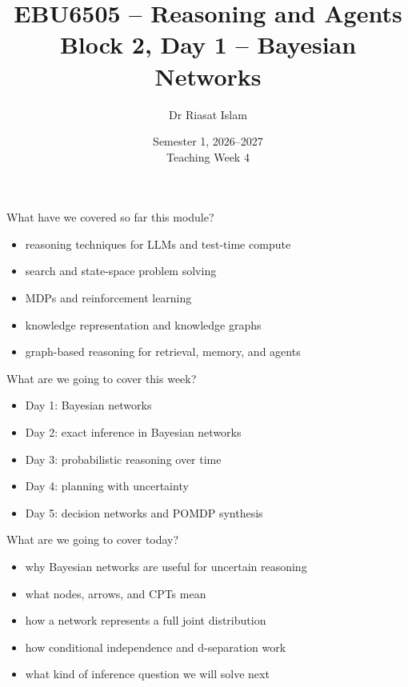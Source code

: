 \documentclass[aspectratio=169]{beamer}
\title[EBU6505 B2 D1]{EBU6505 -- Reasoning and Agents\\Block 2, Day 1 -- Bayesian Networks}
\author{Dr Riasat Islam}
\institute{Queen Mary University of London}
\date[Teaching Week 4]{Semester 1, 2026--2027 \\ Teaching Week 4}
\newcommand{\defaultdeckrefs}{AIMA4e Ch.12--13 pp.385--460; Poole3e Ch.9 pp.375--458}
\newcommand{\currentsliderefs}{\defaultdeckrefs}
\newcommand{\setslideref}[1]{\gdef\currentsliderefs{#1}}
\begin{document}
\setslideref{AIMA4e Ch.12--13 pp.385--460; Poole3e Ch.9 pp.375--458}
\begin{frame}
  \titlepage
\end{frame}

\begin{frame}{What have we covered so far this module?}
\begin{itemize}
  \item reasoning techniques for LLMs and test-time compute
  \item search and state-space problem solving
  \item MDPs and reinforcement learning
  \item knowledge representation and knowledge graphs
  \item graph-based reasoning for retrieval, memory, and agents
\end{itemize}
\end{frame}

\begin{frame}{What are we going to cover this week?}
\begin{itemize}
  \item Day 1: Bayesian networks
  \item Day 2: exact inference in Bayesian networks
  \item Day 3: probabilistic reasoning over time
  \item Day 4: planning with uncertainty
  \item Day 5: decision networks and POMDP synthesis
\end{itemize}
\end{frame}

\begin{frame}{What are we going to cover today?}
\begin{itemize}
  \item why Bayesian networks are useful for uncertain reasoning
  \item what nodes, arrows, and CPTs mean
  \item how a network represents a full joint distribution
  \item how conditional independence and d-separation work
  \item what kind of inference question we will solve next
\end{itemize}
\end{frame}
\end{document}

